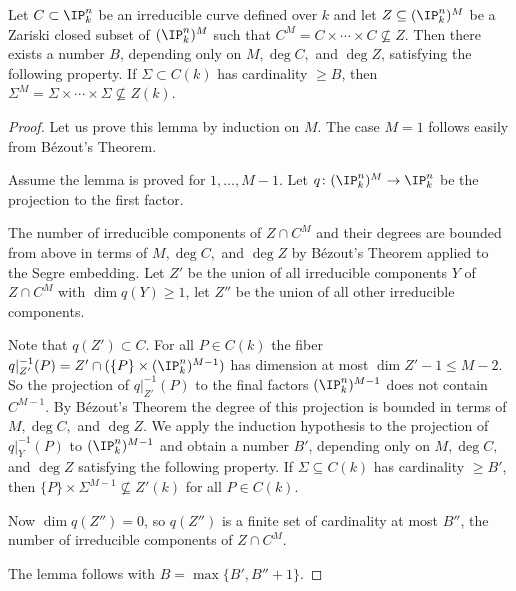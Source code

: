 \begin{lemma}
\notready\label{LemmaNAlon}
  Let $C \subset \IP_k^n$ be an
  irreducible curve defined over $k$ and let $Z \subseteq (\IP_k^n)^M$
  be a Zariski closed subset of $(\IP_k^n)^M$ such that $C^M = C \times
  \cdots \times C \not\subseteq Z$. Then there exists a number $B$,
  depending only on $M, \deg C,$ and $\deg Z$, satisfying the following
  property. If $\Sigma \subset C(k)$ has cardinality $\ge B$, then
  $\Sigma^M = \Sigma \times \cdots \times \Sigma \not\subseteq Z(k)$.
\end{lemma}
\begin{proof}%
  Let us prove this lemma by induction on $M$. The case $M = 1$ follows
  easily from B\'{e}zout's Theorem.

  Assume the lemma is proved for $1, \ldots, M-1$. Let $q \colon
  (\IP_k^n)^M \rightarrow \IP_k^n$ be the projection to the first
  factor.

  The number of irreducible components of $Z \cap C^M$ and their degrees
  are bounded from above in terms of $M,\deg C,$ and $\deg Z$ by
  B\'ezout's Theorem applied to the Segre embedding.
  Let $Z'$ be the union of all  irreducible
  components $Y$ of $Z \cap C^M$ with $\dim q(Y)\ge 1$, let $Z''$ be the
  union of all other irreducible components.

  Note that $q(Z')\subset C$. For all $P \in C(k)$ the fiber
  $q|_{Z'}^{-1}(P)=Z'\cap (\{P\}\times (\IP_k^n)^{M-1})$ has
  dimension at most
  $\dim Z'-1\le M-2$. So the projection of $q|_{Z'}^{-1}(P)$ to the final
  factors $(\IP_k^n)^{M-1}$ does not contain $C^{M-1}$. By B\'ezout's
  Theorem the degree of this projection is bounded in terms of $M,\deg
  C,$ and $\deg Z$. We apply the induction hypothesis to the projection
  of $q|_Y^{-1}(P)$ to $(\IP_k^n)^{M-1}$ and obtain a number $B'$,
  depending only on $M,\deg C,$ and $\deg Z$ satisfying the following
  property. If $\Sigma \subseteq C(k)$ has cardinality $\ge B'$, then
  $\{P\} \times \Sigma^{M-1} \not\subseteq Z'(k)$ for all $P \in C(k)$.

  Now $\dim q(Z'') = 0$, so $q(Z'')$ is a finite set of cardinality
  at most $B''$, the number of irreducible components of
  $Z\cap C^M$.

  The lemma follows with $B=\max\{B',B''+1\}$.
\end{proof}

